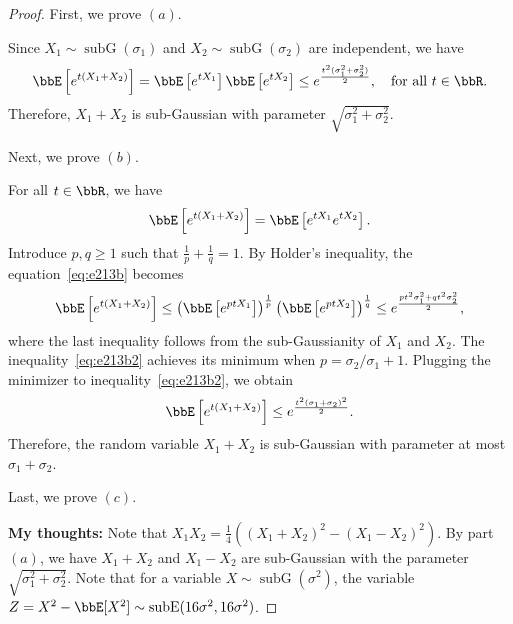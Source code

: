 \documentclass[11pt]{article}
\DeclareMathOperator{\subG}{subG}
\newcommand{\of}[1]{\left(#1\right)}
\newcommand{\off}[1]{\left[#1\right]}
\theoremstyle{plain}
\theoremstyle{definition}
\begin{document}
\begin{proof}
	First, we prove $(a)$.
	
	\vspace{0.2cm}
	Since $X_1\sim \subG(\sigma_1)$ and $X_2 \sim \subG(\sigma_2)$ are independent, we have
	\begin{equation}
		\bbE\off{e^{t(X_1 + X_2)}} = \bbE\off{e^{tX_1}} \bbE\off{e^{tX_2}} \leq e^{\frac{t^2(\sigma_1^2 + \sigma_2^2)}{2}},\quad \text{for all }t \in \bbR.
	\end{equation}
	Therefore, $X_1 +X_2$ is sub-Gaussian with parameter $\sqrt{\sigma_1^2 + \sigma_2^2}$.
	
	\vspace{0.2cm}
Next, we prove $(b)$.

\vspace{0.2cm}
For all $t \in \bbR$, we have
\begin{equation}\label{eq:e213b}
	\bbE\off{e^{t(X_1 + X_2)}} = \bbE \off{e^{t X_1} e^{t X_2}}.
\end{equation}
Introduce $p,q \geq 1$ such that $\frac{1}{p} + \frac{1}{q} = 1$. By Holder's inequality, the equation~\eqref{eq:e213b} becomes
\begin{equation}\label{eq:e213b2}
	\bbE\off{e^{t(X_1 + X_2)}} \leq \of{\bbE \off{e^{ p t X_1}  } }^{\frac{1}{p}}
	 \of{\bbE \off{e^{ pt X_2}  }}^{\frac{1}{q}} \leq e^{  \frac{pt^2 \sigma_1^2 + qt^2 \sigma_2^2}{2} },
\end{equation}
where the last inequality follows from the sub-Gaussianity of $X_1$ and $X_2$. The inequality~\eqref{eq:e213b2} achieves its minimum when $p = \sigma_2/\sigma_1 +1$. Plugging the minimizer to inequality~\eqref{eq:e213b2}, we obtain
\begin{equation}
	\bbE\off{e^{t(X_1 + X_2)}} \leq e^{\frac{t^2(\sigma_1 + \sigma_2
	)^2}{2}}.
\end{equation}
Therefore, the random variable $X_1 + X_2$ is sub-Gaussian with parameter at most $\sigma_1 + \sigma_2$.

\vspace{0.2cm}

Last, we prove $(c)$.

\vspace{0.2cm}
\textbf{My thoughts:} Note that $X_1 X_2 = \frac{1}{4}\of{(X_1 + X_2)^2 - (X_1 - X_2)^2}$. By part $(a)$, we have $X_1 + X_2$ and $X_1 - X_2$ are sub-Gaussian with the parameter $\sqrt{\sigma_1^2 + \sigma^2_2}$. Note that for a variable $X \sim \subG(\sigma^2)$, the variable $Z = X^2 - \bbE[X^2] \sim \text{subE}(16\sigma^2, 16\sigma^2)$. 
\vspace{0.2cm}


\end{proof}
\end{document}
